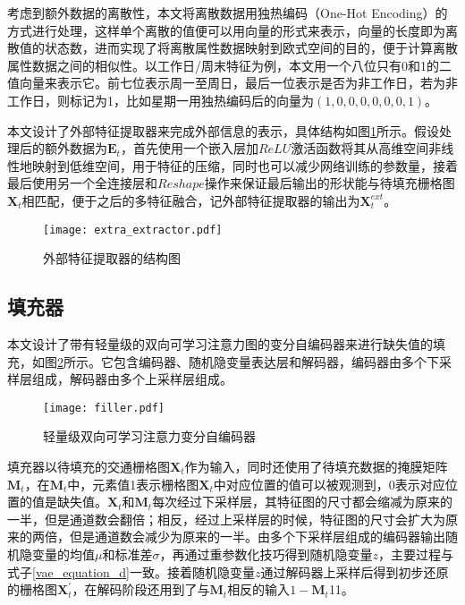考虑到额外数据的离散性，本文将离散数据用独热编码（One-Hot Encoding）的方式进行处理，这样单个离散的值便可以用向量的形式来表示，向量的长度即为离散值的状态数，进而实现了将离散属性数据映射到欧式空间的目的，便于计算离散属性数据之间的相似性。以工作日/周末特征为例，本文用一个八位只有0和1的二值向量来表示它。前七位表示周一至周日，最后一位表示是否为非工作日，若为非工作日，则标记为1，比如星期一用独热编码后的向量为$(1, 0, 0, 0,0,0,0,1)$。

本文设计了外部特征提取器来完成外部信息的表示，具体结构如图\ref{extra_extractor}所示。假设处理后的额外数据为$\mathbf{E}_t$，首先使用一个嵌入层加$ReLU$激活函数将其从高维空间非线性地映射到低维空间，用于特征的压缩，同时也可以减少网络训练的参数量，接着最后使用另一个全连接层和$Reshape$操作来保证最后输出的形状能与待填充栅格图$\mathbf{X}_t$相匹配，便于之后的多特征融合，记外部特征提取器的输出为$\mathbf{X}_t^{ext}$。

\begin{figure}[htbp]
\centering
\texttt{[image: extra\_extractor.pdf]}
\vspace{-4em}
\caption{外部特征提取器的结构图 \label{extra_extractor}}
\end{figure}

\subsection{填充器}
本文设计了带有轻量级的双向可学习注意力图的变分自编码器来进行缺失值的填充，如图\ref{filler}所示。它包含编码器、随机隐变量表达层和解码器，编码器由多个下采样层组成，解码器由多个上采样层组成。

\begin{figure}[htbp]
\centering
\texttt{[image: filler.pdf]}
\vspace{-1em}
\caption{轻量级双向可学习注意力变分自编码器 \label{filler}}
\end{figure}

填充器以待填充的交通栅格图$\mathbf{X}_t$作为输入，同时还使用了待填充数据的掩膜矩阵$\mathbf{M}_t$，在$\mathbf{M}_t$中，元素值1表示栅格图$\mathbf{X}_t$中对应位置的值可以被观测到，0表示对应位置的值是缺失值。$\mathbf{X}_t$和$\mathbf{M}_t$每次经过下采样层，其特征图的尺寸都会缩减为原来的一半，但是通道数会翻倍；相反，经过上采样层的时候，特征图的尺寸会扩大为原来的两倍，但是通道数会减少为原来的一半。由多个下采样层组成的编码器输出随机隐变量的均值$\mu$和标准差$\sigma$，再通过重参数化技巧得到随机隐变量$z$，主要过程与式子\eqref{vae_equation_d}一致。接着随机隐变量$z$通过解码器上采样后得到初步还原的栅格图$\mathbf{X}_{t}^{'}$，在解码阶段还用到了与$\mathbf{M}_t$相反的输入$1-\mathbf{M}_t$11。

